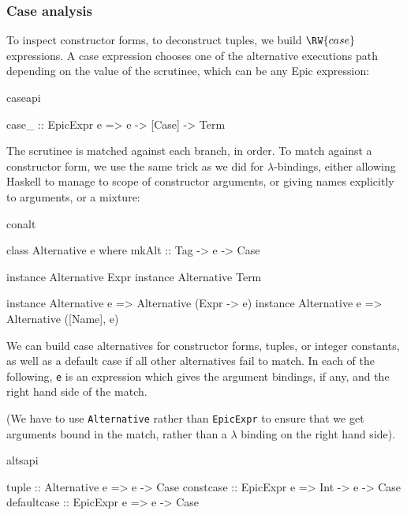 \subsubsection*{Case analysis}

To inspect constructor forms, to deconstruct tuples, we build
$\RW{case}$ expressions. A case expression chooses one of the
alternative executions path depending on the value of the scrutinee,
which can be any Epic expression:

\begin{SaveVerbatim}{caseapi}

case_ :: EpicExpr e => e -> [Case] -> Term

\end{SaveVerbatim}

\noindent
The scrutinee is matched against each branch, in order. To match
against a constructor form, we use the same trick as we did for
$\lambda$-bindings, either allowing Haskell to manage to scope of
constructor arguments, or giving names explicitly to arguments, or a
mixture:

\begin{SaveVerbatim}{conalt}

class Alternative e where
    mkAlt :: Tag -> e -> Case

instance Alternative Expr
instance Alternative Term

instance Alternative e => Alternative (Expr -> e)
instance Alternative e => Alternative ([Name], e)

\end{SaveVerbatim}

We can build case alternatives for constructor forms, tuples, or
integer constants, as well as a default case if all other alternatives
fail to match. In each of the following, \texttt{e} is an expression
which gives the argument bindings, if any, and the right hand side of
the match.

(We have to use \texttt{Alternative} rather than
\texttt{EpicExpr} to ensure that we get arguments bound in the match,
rather than a $\lambda$ binding on the right hand side).

\begin{SaveVerbatim}{altsapi}

tuple       :: Alternative e =>        e -> Case
constcase   :: EpicExpr e    => Int -> e -> Case
defaultcase :: EpicExpr e    =>        e -> Case

\end{SaveVerbatim}

